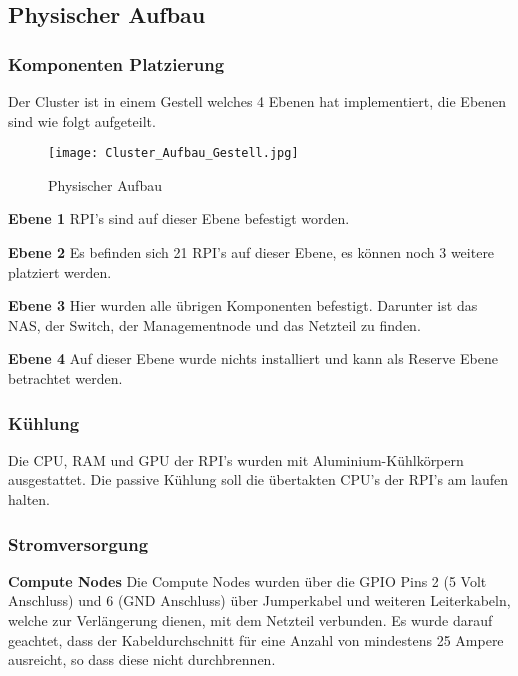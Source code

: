 \subsection{Physischer Aufbau}

\subsubsection{Komponenten Platzierung}
Der Cluster ist in einem Gestell welches 4 Ebenen hat implementiert, die Ebenen sind wie folgt aufgeteilt. \newline

\begin{figure}[htb]
\centering
\texttt{[image: Cluster\_Aufbau\_Gestell.jpg]}
\caption{Physischer Aufbau}
\label{fig:Physischer Aufbau}
\end{figure} 

\textbf{Ebene 1} RPI's sind auf dieser Ebene befestigt worden.

\textbf{Ebene 2}\newline
Es befinden sich 21 RPI's auf dieser Ebene, es können noch 3 weitere platziert werden.

\textbf{Ebene 3}\newline
Hier wurden alle übrigen Komponenten befestigt. Darunter ist das NAS, der Switch, der Managementnode und das Netzteil zu finden.

\textbf{Ebene 4}\newline
Auf dieser Ebene wurde nichts installiert und kann als Reserve Ebene betrachtet werden.

\subsubsection{Kühlung}
Die CPU, RAM und GPU der RPI's wurden mit Aluminium-Kühlkörpern ausgestattet. Die passive Kühlung soll die übertakten CPU's der RPI's am laufen halten.

\subsubsection{Stromversorgung}
\textbf{Compute Nodes}\newline
Die Compute Nodes wurden über die GPIO Pins 2 (5 Volt Anschluss) und 6 (GND Anschluss) über Jumperkabel und weiteren Leiterkabeln, welche zur Verlängerung dienen, mit dem Netzteil verbunden. Es wurde darauf geachtet, dass der Kabeldurchschnitt für eine Anzahl von mindestens 25 Ampere ausreicht, so dass diese nicht durchbrennen.

